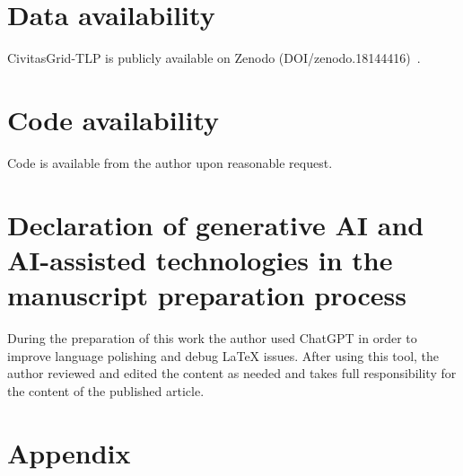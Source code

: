 \documentclass[preprint,12pt]{elsarticle}
\begin{document}
\section*{Data availability}
CivitasGrid-TLP is publicly available on Zenodo (DOI/zenodo.18144416)~\cite{huang_2026_18144416}.

\section*{Code availability}
Code is available from the author upon reasonable request.

\section*{Declaration of generative AI and AI-assisted technologies in the manuscript preparation process}
During the preparation of this work the author used ChatGPT in order to improve language polishing and debug LaTeX issues. After using this tool, the author reviewed and edited the content as needed and takes full responsibility for the content of the published article.




\section{Appendix}
\end{document}
